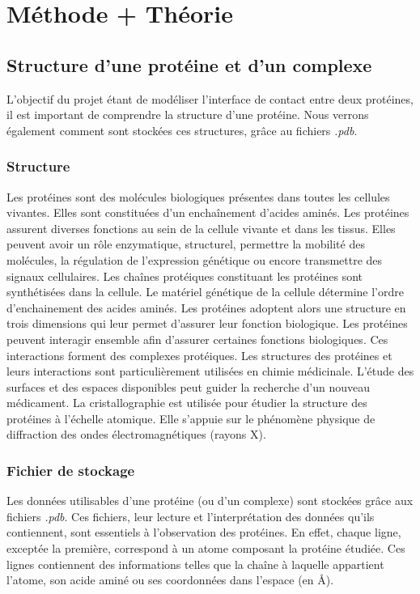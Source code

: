 \chapter{Méthode + Théorie}

\section{Structure d'une protéine et d'un complexe}

L'objectif du projet étant de modéliser l'interface de contact entre deux protéines,
il est important de comprendre la structure d'une protéine. Nous verrons également
comment sont stockées ces structures, grâce au fichiers \textit{.pdb}.

\subsection{Structure}

Les protéines sont des molécules biologiques présentes dans toutes les cellules vivantes.
Elles sont constituées d'un enchaînement d'acides aminés.
Les protéines assurent diverses fonctions au sein de la cellule vivante et dans les tissus.
Elles peuvent avoir un rôle enzymatique, structurel, permettre la mobilité des molécules, la
régulation de l'expression génétique ou encore transmettre des signaux cellulaires.
Les chaînes protéiques constituant les protéines sont synthétisées dans la cellule. Le
matériel génétique de la cellule détermine l'ordre d'enchainement des acides aminés.
Les protéines adoptent alors une structure en trois dimensions qui leur permet d'assurer
 leur fonction biologique. Les protéines peuvent interagir ensemble afin d'assurer certaines
fonctions biologiques. Ces interactions forment des complexes protéiques. Les structures
 des protéines et leurs interactions sont particulièrement utilisées en chimie médicinale.
L'étude des surfaces et des espaces disponibles peut guider la recherche d'un nouveau
médicament. La cristallographie est utilisée pour étudier la structure des protéines à
l'échelle atomique. Elle s'appuie sur le phénomène physique de diffraction des ondes
électromagnétiques (rayons X).

\subsection{Fichier de stockage}

Les données utilisables d'une protéine (ou d'un complexe) sont stockées grâce aux
fichiers \textit{.pdb}. Ces fichiers, leur lecture et l'interprétation des données
qu'ils contiennent, sont essentiels à l'observation des protéines. En effet, chaque
ligne, exceptée la première, correspond à un atome composant la protéine étudiée.
Ces lignes contiennent des informations telles que la chaîne à laquelle appartient
l'atome, son acide aminé ou ses coordonnées dans l'espace (en $\si{\angstrom}$).

